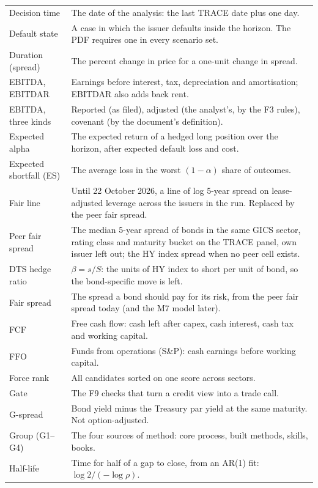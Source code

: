 \documentclass[11pt]{article}
\begin{document}
{\begin{xltabular}{\linewidth}{@{}>{\raggedright\arraybackslash}p{36mm}X@{}}
Decision time & The date of the analysis: the last TRACE date plus one day. \\
Default state & A case in which the issuer defaults inside the horizon. The PDF requires one in every scenario set. \\
Duration (spread) & The percent change in price for a one-unit change in spread. \\
EBITDA, EBITDAR & Earnings before interest, tax, depreciation and amortisation; EBITDAR also adds back rent. \\
EBITDA, three kinds & Reported (as filed), adjusted (the analyst's, by the F3 rules), covenant (by the document's definition). \\
Expected alpha & The expected return of a hedged long position over the horizon, after expected default loss and cost. \\
Expected shortfall (ES) & The average loss in the worst $(1-\alpha)$ share of outcomes. \\
Fair line & Until 22 October 2026, a line of log 5-year spread on lease-adjusted leverage across the issuers in the run. Replaced by the peer fair spread. \\
Peer fair spread & The median 5-year spread of bonds in the same GICS sector, rating class and maturity bucket on the TRACE panel, own issuer left out; the HY index spread when no peer cell exists. \\
DTS hedge ratio & $\beta = s/S$: the units of HY index to short per unit of bond, so the bond-specific move is left. \\
Fair spread & The spread a bond should pay for its risk, from the peer fair spread today (and the M7 model later). \\
FCF & Free cash flow: cash left after capex, cash interest, cash tax and working capital. \\
FFO & Funds from operations (S\&P): cash earnings before working capital. \\
Force rank & All candidates sorted on one score across sectors. \\
Gate & The F9 checks that turn a credit view into a trade call. \\
G-spread & Bond yield minus the Treasury par yield at the same maturity. Not option-adjusted. \\
Group (G1--G4) & The four sources of method: core process, built methods, skills, books. \\
Half-life & Time for half of a gap to close, from an AR(1) fit: $\log 2/(-\log\rho)$. \\

\end{xltabular}}
\end{document}
